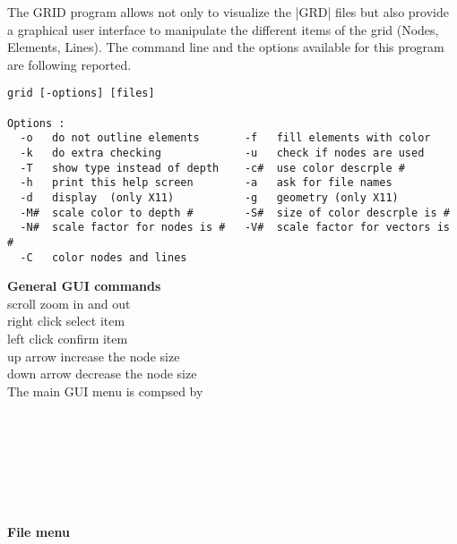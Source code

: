 
The GRID program allows not only to visualize 
the |GRD| files but also provide a graphical user interface 
to manipulate the different items of the grid (Nodes, Elements, Lines).
The command line and the options available for this program are following reported.

\begin{verbatim}
grid [-options] [files] 

Options :
  -o   do not outline elements       -f   fill elements with color  
  -k   do extra checking             -u   check if nodes are used   
  -T   show type instead of depth    -c#  use color descrple #         
  -h   print this help screen        -a   ask for file names        
  -d   display  (only X11)           -g   geometry (only X11)       
  -M#  scale color to depth #        -S#  size of color descrple is #  
  -N#  scale factor for nodes is #   -V#  scale factor for vectors is #
  -C   color nodes and lines     
\end{verbatim}

\textbf{General GUI commands}\\
	scroll 		zoom in and out \\
	right click 	select item\\
	left click	confirm item\\
	up arrow	increase the node size\\
	down arrow 	decrease the node size\\

The main GUI menu is compsed by\\
\\
\\
\\
\\
\\
\\
\\

\textbf{File menu}\\
\par
{}
\par
{}
\par
{}
\par
{}
\par

